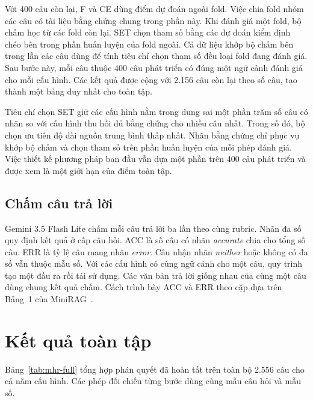 Với 400 câu còn lại, F và CE dùng điểm dự đoán ngoài fold. Việc chia fold nhóm các câu có tài liệu bằng chứng chung trong phần này. Khi đánh giá một fold, bộ chấm học từ các fold còn lại. SET chọn tham số bằng các dự đoán kiểm định chéo bên trong phần huấn luyện của fold ngoài. Cả dữ liệu khớp bộ chấm bên trong lẫn các câu dùng để tính tiêu chí chọn tham số đều loại fold đang đánh giá. Sau bước này, mỗi câu thuộc 400 câu phát triển có đúng một ngữ cảnh đánh giá cho mỗi cấu hình. Các kết quả được cộng với 2.156 câu còn lại theo số câu, tạo thành một bảng duy nhất cho toàn tập.

Tiêu chí chọn SET giữ các cấu hình nằm trong dung sai một phần trăm số câu có nhãn so với cấu hình thu hồi đủ bằng chứng cho nhiều câu nhất. Trong số đó, bộ chọn ưu tiên độ dài nguồn trung bình thấp nhất. Nhãn bằng chứng chỉ phục vụ khớp bộ chấm và chọn tham số trên phần huấn luyện của mỗi phép đánh giá. Việc thiết kế phương pháp ban đầu vẫn dựa một phần trên 400 câu phát triển và được xem là một giới hạn của điểm toàn tập.

\subsection{Chấm câu trả lời}
Gemini 3.5 Flash Lite chấm mỗi câu trả lời ba lần theo cùng rubric. Nhãn đa số quy định kết quả ở cấp câu hỏi. ACC là số câu có nhãn \emph{accurate} chia cho tổng số câu. ERR là tỷ lệ câu mang nhãn \emph{error}. Câu nhận nhãn \emph{neither} hoặc không có đa số vẫn thuộc mẫu số. Với các cấu hình có cùng ngữ cảnh cho một câu, quy trình tạo một đầu ra rồi tái sử dụng. Các văn bản trả lời giống nhau của cùng một câu dùng chung kết quả chấm. Cách trình bày ACC và ERR theo cặp dựa trên Bảng~1 của MiniRAG~\cite{fan2025minirag}.

\ifFullResults
\section{Kết quả toàn tập}
\begin{table}[htbp]\centering
\caption{Kết quả trên toàn bộ MultiHop-RAG (2.556 câu). Mỗi cấu hình có một cặp ACC và ERR tính theo phần trăm.}
\label{tab:mhr-full}
\resizebox{\linewidth}{!}{}
\end{table}

Bảng~\ref{tab:mhr-full} tổng hợp phán quyết đã hoàn tất trên toàn bộ 2.556 câu cho cả năm cấu hình. Các phép đối chiếu từng bước dùng cùng mẫu câu hỏi và mẫu số.
\fi

